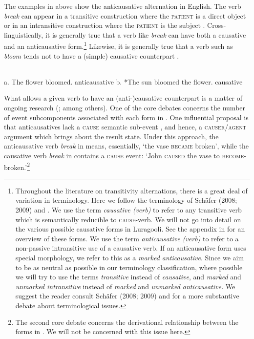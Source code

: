 \documentclass[output=paper]{langsci/langscibook}
\begin{document}
The examples in  above show the anticausative alternation in English. The verb \textit{break} can appear in a transitive construction where the \textsc{patient} is a direct object  or in an intransitive construction where the \textsc{patient} is the subject . Cross-linguistically, it is generally true that a verb like \textit{break} can have both a causative and an anticausative form.\footnote{ Throughout the literature on transitivity alternations, there is a great deal of variation in terminology. Here we follow the terminology of Schäfer (2008; 2009) and \citet{AlexiadouEtAl2015}. We use the term \textit{causative (verb)} to refer to any transitive verb which is semantically reducible to \textsc{cause}-verb. We will not go into detail on the various possible causative forms in Luragooli. See the appendix in \citet{GluckmanBowler2015} for an overview of these forms. We use the term \textit{anticausative (verb)} to refer to a non-passive intransitive use of a causative verb. If an anticausative form uses special morphology, we refer to this as a \textit{marked anticausative}. Since we aim to be as neutral as possible in our terminology classification, where possible we will try to use the terms \textit{transitive} instead of \textit{causative}, and \textit{marked} and \textit{unmarked intransitive }instead of \textit{marked }and \textit{unmarked anticausative. }We suggest the reader consult Schäfer (2008; 2009) and \citet{AlexiadouEtAl2015} for a more substantive debate about terminological issues.} Likewise, it is generally true that a verb such as \textit{bloom}  tends not to have a (simple) causative counterpart .

\ea\label{exx:}
\ea
{}\\
 a.  The flower bloomed.        anticausative
\ex
 b.  *The sun bloomed the flower.      causative
 \z
 \z
 
What allows a given verb to have an (anti-)causative counterpart is a matter of ongoing research (\citealt{Smith1970,Haspelmath1993,LevinRappaportHovav1995,Reinhart1996,Folli2002,Folli2005,AlexiadouAnagnostopoulou2006,Schäfer2008}; among others). One of the core debates concerns the number of event subcomponents associated with each form in . One influential proposal is that anticausatives lack a \textsc{cause} semantic sub-event \citep{Haspelmath1993}, and hence, a \textsc{causer/agent} argument which brings about the result state. Under this approach, the anticausative verb \textit{break} in  means, essentially, ‘the vase \textsc{became} broken’, while the causative verb \textit{break} in  contains a \textsc{cause} event: ‘John \textsc{caused} the vase to \textsc{become}-broken.’\footnote{The second core debate concerns the derivational relationship between the forms in . We will not be concerned with this issue here.}
\end{document}
